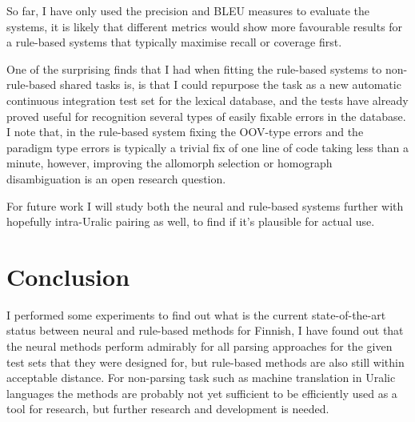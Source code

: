 \documentclass[a4paper,notitlepage]{article}
\newif\ifcameraready{}
\begin{document}
So far, I have only used the precision and BLEU measures to evaluate the
systems, it is likely that different metrics would show more favourable
results for a rule-based systems that typically maximise recall or coverage
first.

One of the surprising finds that I had when fitting the rule-based systems to
non-rule-based shared tasks is, is that I could repurpose the task as
a new automatic continuous integration test set for the lexical database, and
the tests have already proved useful for recognition several types of easily
fixable errors in the database. I note that, in the rule-based system fixing
the OOV-type errors and the paradigm type errors is typically a trivial fix
of one line of code taking less than a minute, however, improving the
allomorph selection or homograph disambiguation is an open research question.

For future work I will study both the neural and rule-based systems further
with hopefully intra-Uralic pairing as well, to find if it's plausible for
actual use.

\section{Conclusion}
\label{sec:conclusion}

I performed some experiments to find out what is the current state-of-the-art
status between neural and rule-based methods for Finnish, I have found out that
the neural methods perform admirably for all parsing approaches for the given
test sets that they were designed for, but rule-based methods are also still
within acceptable distance. For non-parsing task such as machine translation in
Uralic languages the methods are probably not yet sufficient to be efficiently
used as a tool for research, but further research and development is needed.


\ifcameraready{}
\section*{Acknowledgments}

The author was employed by CLARIN-D during the writing of the article.

\fi



\end{document}
